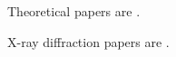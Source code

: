 \documentclass[12pt,twoside]{report}
\date{\today}
\begin{document}
 


Theoretical papers are
\cite{Lubensky93,Chen95,Kamal11}.

X-ray diffraction papers are
\cite{Sun96,Sengupta03}.

\nocite{*}



%
\end{document}
